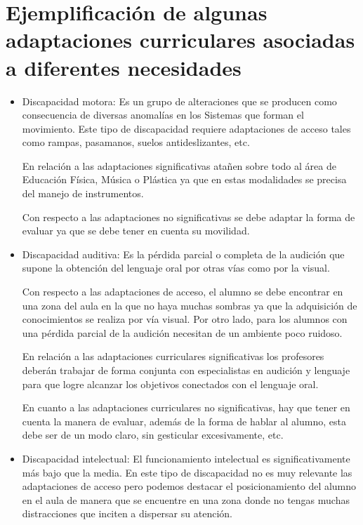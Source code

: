 \section{Ejemplificación de algunas adaptaciones curriculares asociadas a diferentes necesidades }

\begin{itemize}
    \item Discapacidad motora: Es un grupo de alteraciones que se producen como consecuencia de diversas anomalías en los Sistemas que forman el movimiento. Este tipo de discapacidad requiere  adaptaciones de acceso tales como rampas, pasamanos, suelos antideslizantes, etc. 
    
    En relación a las adaptaciones significativas atañen sobre todo al área de Educación Física, Música o Plástica ya que en estas modalidades se precisa del manejo de instrumentos. 

    Con respecto a las adaptaciones no significativas se debe adaptar la forma de evaluar ya que se debe tener en cuenta su movilidad. 
    
    \item Discapacidad auditiva: Es la pérdida parcial o completa de la audición que supone la obtención del lenguaje oral por otras vías como por la visual. 
    
    Con respecto a las adaptaciones de acceso, el alumno se debe encontrar en una zona del aula en la que no haya muchas sombras ya que la adquisición de conocimientos se realiza por vía visual. Por otro lado, para los alumnos con una pérdida parcial de la audición necesitan de un ambiente poco ruidoso. 
    
    En relación a las adaptaciones curriculares significativas los profesores deberán trabajar de forma conjunta con especialistas en audición y lenguaje para que logre alcanzar los objetivos conectados con el lenguaje oral.

    En cuanto a las adaptaciones curriculares no significativas, hay que tener en cuenta la manera de evaluar, además de la forma de hablar al alumno, esta debe ser de un modo claro, sin gesticular excesivamente, etc.
    
    \item Discapacidad intelectual: El funcionamiento intelectual es significativamente más bajo que la media. En este tipo de discapacidad no es muy relevante las adaptaciones de acceso pero podemos destacar el posicionamiento del alumno en el aula de manera que se encuentre en una zona donde no tengas muchas distracciones  que inciten a dispersar su atención.
    

\end{itemize}
